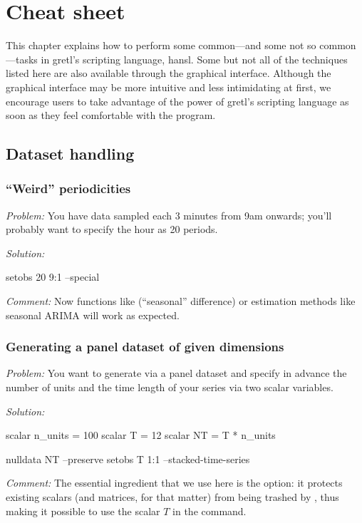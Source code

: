 \chapter{Cheat sheet}
\label{chap:cheatsheet}

This chapter explains how to perform some common---and some not so
common---tasks in gretl's scripting language, hansl.  Some but not
all of the techniques listed here are also available through the
graphical interface.  Although the graphical interface may be more
intuitive and less intimidating at first, we encourage users to take
advantage of the power of gretl's scripting language as soon as
they feel comfortable with the program.

\section{Dataset handling}

\subsection{``Weird'' periodicities}

\emph{Problem:} You have data sampled each 3 minutes from 9am onwards;
you'll probably want to specify the hour as 20 periods.

\emph{Solution:}
\begin{code}
setobs 20 9:1 --special
\end{code}

\emph{Comment:} Now functions like  (``seasonal''
difference) or estimation methods like seasonal ARIMA will work as
expected.

\subsection{Generating a panel dataset of given dimensions}

\emph{Problem:} You want to generate via  a panel
dataset and specify in advance the number of units and the time length
of your series via two scalar variables. 

\emph{Solution:}
\begin{code}
scalar n_units = 100
scalar T = 12
scalar NT = T * n_units

nulldata NT --preserve
setobs T 1:1 --stacked-time-series
\end{code}

\emph{Comment:} The essential ingredient that we use here is the
 option: it protects existing scalars (and matrices,
for that matter) from being trashed by , thus making it
possible to use the scalar $T$ in the  command.

